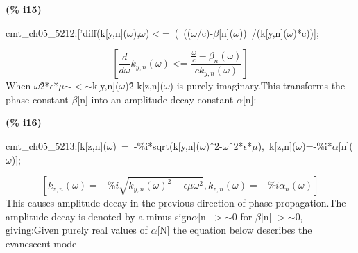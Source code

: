 \documentclass[fleqn]{article}
\begin{document}
\noindent
\begin{minipage}[t]{4.000000em}\color{red}\bfseries
(\% i15)	
\end{minipage}
\begin{minipage}[t]{\textwidth}\color{blue}
cmt\_ch05\_5212:['diff(k[y,n](\ensuremath{\omega}),\ensuremath{\omega})\ensuremath{<}=\ (\ ((\ensuremath{\omega}/c)-\ensuremath{\beta}[n](\ensuremath{\omega}))\ /(k[y,n](\ensuremath{\omega})*c))];
\end{minipage}
\[\displaystyle \tag{\% o15} 
\left[ \frac{d}{d \omega } {k_{y,n}}\left( \omega \right) \operatorname{<  =}\frac{\frac{\omega }{c}-{{\beta }_n}\left( \omega \right) }{c {k_{y,n}}\left( \omega \right) }\right] \mbox{}
\]
When \ensuremath{\omega}\^ 2*\ensuremath{\epsilon}*\ensuremath{\mu}\ensuremath{\sim }\ensuremath{<}\ensuremath{\sim }k[y,n](\ensuremath{\omega})\^ 2 k[z,n](\ensuremath{\omega}) is purely imaginary.This transforms the phase constant \ensuremath{\beta}[n] into an amplitude decay constant \ensuremath{\alpha}[n]:



\noindent
\begin{minipage}[t]{4.000000em}\color{red}\bfseries
(\% i16)	
\end{minipage}
\begin{minipage}[t]{\textwidth}\color{blue}
cmt\_ch05\_5213:[k[z,n](\ensuremath{\omega})\ =\ -\%i*sqrt(k[y,n](\ensuremath{\omega})\^\ 2-\ensuremath{\omega}\^\ 2*\ensuremath{\epsilon}*\ensuremath{\mu}),\ k[z,n](\ensuremath{\omega})=-\%i*\ensuremath{\alpha}[n](\ensuremath{\omega})];
\end{minipage}
\[\displaystyle \tag{\% o16} 
\left[ {k_{z,n}}\left( \omega \right) =-\% i \sqrt{{{{k_{y,n}}\left( \omega \right) }^{2}}-\epsilon  \mu  {{\omega }^{2}}}\operatorname{,}{k_{z,n}}\left( \omega \right) =-\% i {{\alpha }_n}\left( \omega \right) \right] \mbox{}
\]
This causes amplitude decay in the previous  direction of phase propagation.The amplitude decay is denoted by a minus sign\ensuremath{\alpha}[n] \ensuremath{>}\ensuremath{\sim }0 for \ensuremath{\beta}[n] \ensuremath{>}\ensuremath{\sim }0, giving:Given purely real values of \ensuremath{\alpha}[N] the equation below describes the evanescent mode
\end{document}
